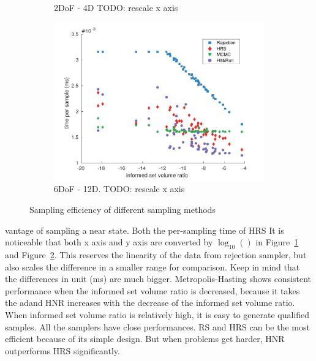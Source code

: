 \documentclass[letterpaper, 10 pt, conference]{ieeeconf}  %
\begin{document}
\begin{figure}[t!]
\begin{subfigure}[b]{0.78\linewidth}
		\caption{2DoF - 4D TODO: rescale x axis}
		\label{fig:sampling_efficiency:2d}
	\end{subfigure}
	\begin{subfigure}[b]{0.78\linewidth}
		\includegraphics[width=\linewidth]{fig/sampling_efficiency/sample_efficiency_6d}
		\caption{6DoF - 12D. TODO: rescale x axis}
		\label{fig:sampling_efficiency:6d}
	\end{subfigure}
	\caption{\captionstyle Sampling efficiency of different sampling methods}
	\label{fig:sampling_efficiency}
\end{figure} 
vantage of sampling a near state.
Both the per-sampling time of HRS 
It is noticeable that both x axis and y axis are converted by $ \log_{10} () $ in Figure~\ref{fig:sampling_efficiency:2d} and Figure~\ref{fig:sampling_efficiency:6d}.
This reserves the linearity of the data from rejection sampler, but also scales the difference in a smaller range for comparison.
Keep in mind that the differences in unit (ms) are much bigger.
Metropolis-Hasting shows consistent performance when the informed set volume ratio is decreased, because it takes the adand HNR increases with the decrease of the informed set volume ratio. 
When informed set volume ratio is relatively high, it is easy to generate qualified samples.
All the samplers have close performances.
RS and HRS can be the most efficient because of its simple design.
But when problems get harder, HNR outperforms HRS significantly.
\end{document}

